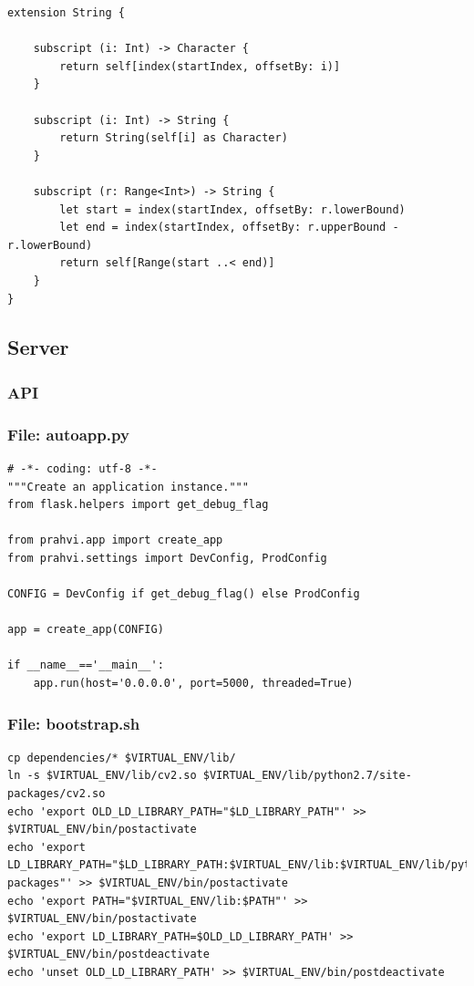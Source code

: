 \begin{lstlisting}
extension String {
    
    subscript (i: Int) -> Character {
        return self[index(startIndex, offsetBy: i)]
    }
    
    subscript (i: Int) -> String {
        return String(self[i] as Character)
    }
    
    subscript (r: Range<Int>) -> String {
        let start = index(startIndex, offsetBy: r.lowerBound)
        let end = index(startIndex, offsetBy: r.upperBound - r.lowerBound)
        return self[Range(start ..< end)]
    }
}
\end{lstlisting}

\subsection{Server}

\subsubsection{API}

\subsubsection{File: autoapp.py}
\begin{lstlisting}
# -*- coding: utf-8 -*-
"""Create an application instance."""
from flask.helpers import get_debug_flag

from prahvi.app import create_app
from prahvi.settings import DevConfig, ProdConfig

CONFIG = DevConfig if get_debug_flag() else ProdConfig

app = create_app(CONFIG)

if __name__=='__main__':
    app.run(host='0.0.0.0', port=5000, threaded=True)
\end{lstlisting}

\subsubsection{File: bootstrap.sh}
\begin{lstlisting}
cp dependencies/* $VIRTUAL_ENV/lib/
ln -s $VIRTUAL_ENV/lib/cv2.so $VIRTUAL_ENV/lib/python2.7/site-packages/cv2.so
echo 'export OLD_LD_LIBRARY_PATH="$LD_LIBRARY_PATH"' >> $VIRTUAL_ENV/bin/postactivate
echo 'export LD_LIBRARY_PATH="$LD_LIBRARY_PATH:$VIRTUAL_ENV/lib:$VIRTUAL_ENV/lib/python2.7/site-packages"' >> $VIRTUAL_ENV/bin/postactivate
echo 'export PATH="$VIRTUAL_ENV/lib:$PATH"' >> $VIRTUAL_ENV/bin/postactivate
echo 'export LD_LIBRARY_PATH=$OLD_LD_LIBRARY_PATH' >> $VIRTUAL_ENV/bin/postdeactivate
echo 'unset OLD_LD_LIBRARY_PATH' >> $VIRTUAL_ENV/bin/postdeactivate
\end{lstlisting}

